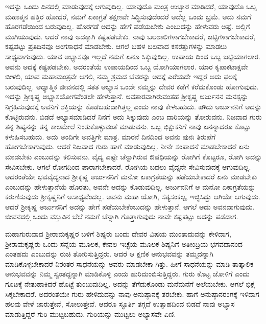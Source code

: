 ಇದನ್ನು ಒಂದು ದಿನದಲ್ಲಿ ಮಾಡುವುದಕ್ಕೆ ಆಗುವುದಿಲ್ಲ. ಯಾವುದೊ ಮಂತ್ರ ಉಚ್ಚಾರ ಮಾಡಿದರೆ, ಯಾವುದೊ ಒಬ್ಬ ಮಹಾತ್ಮನ ಹತ್ತಿರ ಹೋದರೆ, ನಮಗೆ ಏಕಾಗ್ರತೆ ತಕ್ಷಣವೇ ಸಿದ್ಧಿಸುವುದೆಂದರೆ ಅದೆಲ್ಲ ಒಂದು ಭ್ರಮೆ. ಅದು ನಮಗೆ ಹೊರಗಡೆಯಿಂದ ಬರುವುದಿಲ್ಲ. ಹೊರಗಡೆ ಅದನ್ನು ಹೇಗೆ ಪಡೆಯಬೇಕು ಎಂಬುದನ್ನು ಹೇಳುವರು ಅಷ್ಟೆ. ಅಲ್ಲಿಗೆ ಮುಗಿಯುವುದು. ಆದರೆ ನಾವು ಅದಕ್ಕಾಗಿ ಕಷ್ಟಪಡಬೇಕು. ನಾವು ಬಲಶಾಲಿಗಳಾಗಬೇಕಾದರೆ, ಜಟ್ಟಿಗಳಾಗಬೇಕಾದರೆ, ಕಷ್ಟಪಟ್ಟು ಪ್ರತಿದಿನವೂ ಅಂಗಸಾಧನೆ ಮಾಡಬೇಕು. ಆಗಲೆ ಬಹಳ ಬಲವಾದ ಕಸರತ್ತುಗಳನ್ನು ಮಾಡಲು ಸಾಧ್ಯವಾಗುವುದು. ಯಾವ ಅಭ್ಯಾಸವೂ ಇಲ್ಲದೆ ನಮಗೆ ಏನೂ ಸಿಕ್ಕುವುದಿಲ್ಲ. ಉಪಾಯ ದಿಂದ ಒಬ್ಬ ಜಟ್ಟಿಯಾಗಲಾರ. ಅವನು ಅದಕ್ಕೆ ಕಷ್ಟಪಡಬೇಕು. ಅದರಂತೆಯೆ ಉಪಾಯದಿಂದ ಒಬ್ಬ ಯೋಗಿಯಾಗಲಾರ. ಯಾರ ಕೃಪಾಕಟಾಕ್ಷವೇ ಬೀಳಲಿ, ಯಾವ ಮಹಾಮಂತ್ರವೇ ಆಗಲಿ, ನಮ್ಮ ಶ್ರಮದ ಬೆವರನ್ನು ಅದಕ್ಕೆ ಎರೆಯದೇ ಇದ್ದರೆ ಅದು ಫಲಕ್ಕೆ ಬರುವುದಿಲ್ಲ. ಆಧ್ಯಾತ್ಮಿಕ ಜೀವನದಲ್ಲಿ ಸತತ ಅಭ್ಯಾಸ ಒಂದೇ ನಮ್ಮನ್ನು ದೇವರ ಕಡೆಗೆ ಕರೆದುಕೊಂಡು ಹೋಗುವುದು. ಇದನ್ನು ಶ್ರೀಕೃಷ್ಣ ಅಭ್ಯಾಸಯೋಗವೆಂತಲೇ ಹೇಳುತ್ತಾನೆ. ಅವತಾರವಾಗಿರುವಂತಹ ಶ್ರೀಕೃಷ್ಣ ಅರ್ಜುನನ ಮನಸ್ಸನ್ನು ನಿಗ್ರಹಿಸುವುದಕ್ಕೆ ಅವನಿಗೆ ಶಕ್ತಿಯನ್ನು ಕೊಡಬಹುದಾಗಿತ್ತಲ್ಲ ಎಂದು ನಾವು ಕೇಳಬಹುದು. ಹೌದು ಅರ್ಜುನನಿಗೆ ಅದನ್ನು ಕೊಟ್ಟಿರುವನು. ಬಿಡದೆ ಅಭ್ಯಾಸಮಾಡಿದರೆ ನಿನಗೆ ಅದು ಸಿಕ್ಕುವುದು ಎಂಬ ದಾರಿಯನ್ನು ತೋರುವನು. ನಿಜವಾದ ಗುರು ತನ್ನ ಶಿಷ್ಯನನ್ನು ತನ್ನ ಕಾಲಮೇಲೆ ನಿಂತುಕೊಳ್ಳುವಂತೆ ಮಾಡುವನು. ಒಬ್ಬ ಭಿಕ್ಷುಕನಿಗೆ ನಾವು ಏನನ್ನಾದರೂ ಕೊಟ್ಟು ಕಳುಹಿಸಬಹುದು. ಅದು ಅಂದಿಗೇ ಅವತ್ತಿಗೇ ಮಾತ್ರ. ಮಾರನೆ ದಿನದಿಂದ ಅವನು ಪುನಃ ತಿರುಪೆಗೆ ಹೋಗಬೇಕಾಗುವುದು. ಆದರೆ ನಿಜವಾದ ಗುರು ಹಾಗೆ ಮಾಡುವುದಿಲ್ಲ. ನೀನೇ ಸಂಪಾದನೆ ಮಾಡಬೇಕಾದರೆ ಏನು ಮಾಡಬೇಕು ಎಂಬುದನ್ನು ಕಲಿಸುವನು. ವೈದ್ಯ ಎಷ್ಟೇ ಚೆನ್ನಾಗಿರುವ ಔಷಧಿಯನ್ನು ರೋಗಿಗೆ ಕೊಟ್ಟರೂ, ರೋಗಿ ಅದನ್ನು ಸೇವಿಸಬೇಕು. ಆಗಲೆ ರೋಗದಿಂದ ಪಾರಾಗಬೇಕಾದರೆ. ರೋಗಿಯ ಬದಲು ವೈದ್ಯನೇ ಸೇವಿಸುವುದಕ್ಕೆ ಆಗುವುದಿಲ್ಲ. ಅದರಂತೆಯೇ ಭವವೈದ್ಯನಾದ ಶ್ರೀಕೃಷ್ಣ ಅರ್ಜುನನಿಗೆ ಮನೋ ಏಕಾಗ್ರತೆಯನ್ನು ಪಡೆಯಬೇಕಾದರೆ ಏನು ಮಾಡಬೇಕು ಎಂಬುದನ್ನು ಹೇಳುತ್ತಾನೆಯೆ ಹೊರತು, ಅವನೇ ಅದನ್ನು ಕೊಡುವುದಿಲ್ಲ. ಅರ್ಜುನನಿಗೆ ಆ ಮನೋ ಏಕಾಗ್ರತೆಯನ್ನು ಕರುಣಿಸುವುದು ಶ್ರೀಕೃಷ್ಣನಿಗೆ ಅಸಾಧ್ಯವೆಂದಲ್ಲ. ಅವನು ಮಹಾ ಯೋಗಿ, ಸತ್ಯಸಂಕಲ್ಪ, ಇಚ್ಛಿಸಿದ್ದು ಆಗಿಯೇ ಆಗುವುದು. ಆದರೆ ಶ್ರೀಕೃಷ್ಣ ಅರ್ಜುನನಿಗೆ ಅದನ್ನು ಹೇಗೆ ಪಡೆಯಬೇಕೆಂಬುದನ್ನು ಹೇಳುತ್ತಾನೆ. ಆಗಲೆ ಅದು ಅವನದಾಗುವುದು. ಜೀವನದಲ್ಲಿ ಒಂದು ವಸ್ತುವಿನ ಬೆಲೆ ನಮಗೆ ಚೆನ್ನಾಗಿ ಗೊತ್ತಾಗುವುದು ನಾವೇ ಕಷ್ಟಪಟ್ಟು ಅದನ್ನು ಪಡೆದಾಗ.

ಮಹಾಗುರುವಾದ ಶ್ರೀರಾಮಕೃಷ್ಣರ ಬಳಿಗೆ ಶಿಷ್ಯರು ಬಂದು ದೇವರ ವಿಷಯ ಮುಂತಾದುವನ್ನು ಕೇಳಿದಾಗ, ಶ್ರೀರಾಮಕೃಷ್ಣರು ಒಂದು ಸನ್ನೆಯ ಮೂಲಕ, ಕೇವಲ ಇಚ್ಛೆಯ ಮೂಲಕ ಶಿಷ್ಯನಿಗೆ ಅತೀಂದ್ರಿಯ ಭಗವದಾನಂದ ಎಂತಹದು ಎಂಬುದನ್ನು ರುಚಿ ತೋರಿಸುತ್ತಿದ್ದರು. ಆದರೆ ಆ ಕ್ಷಣಿಕ ಅನುಭವವನ್ನು ತಮ್ಮದನ್ನಾಗಿ ಮಾಡಿಕೊಳ್ಳಬೇಕಾದರೆ ನಿರಂತರ ಸಾಧನೆಯನ್ನು ಅವರು ಮಾಡಬೇಕಾ ಗಿತ್ತು. ಹೀಗೆ ಸಾಧನೆಯನ್ನು ಮಾಡಿ ತಾತ್ಕಾಲಿಕ ಅನುಭವವನ್ನು ನಿಮ್ಮ ಸ್ವಂತದ್ದನ್ನಾಗಿ ಮಾಡಿಕೊಳ್ಳಿ ಎಂದು ಹುರಿದುಂಬಿಸುತ್ತಿದ್ದರು. ಗುರು ಕೊಟ್ಟ ಜೋಳಿಗೆ ಎಂದು ಗೂಟಕ್ಕೆ ನೇತುಹಾಕಿದರೆ ಹೊಟ್ಟೆ ತುಂಬುವುದಿಲ್ಲ. ಅದನ್ನು ತೆಗೆದುಕೊಂಡು ಮನೆಮನೆಗೆ ಅಲೆಯಬೇಕು. ಆಗಲೆ ಭಿಕ್ಷೆ ಸಿಕ್ಕಬೇಕಾದರೆ. ಅದರಂತೆಯೇ ಗುರು ಹೇಳಿದುದನ್ನು ನಾವು ಅನುಷ್ಠಾನಕ್ಕೆ ತರಬೇಕು. ಹಾಗೆ ಅನುಷ್ಠಾನರಂಗಕ್ಕೆ ಇಳಿದಾಗ ಹಲವು ವೇಳೆ ಜಾರುತ್ತೇವೆ, ಸೋಲುತ್ತೇವೆ. ಆದರೂ ಸ್ಫೂರ್ತಿ ತಗ್ಗದೆ ಉತ್ಸಾಹದಿಂದ ಬಿಡದೆ ನಾವು ಅಭ್ಯಾಸ ಮಾಡುತ್ತಿದ್ದರೆ ಗುರಿ ಮುಟ್ಟಬಹುದು. ಗುರಿಯನ್ನು ಮುಟ್ಟಲು ಅಭ್ಯಾಸವೇ ಏಣಿ.

